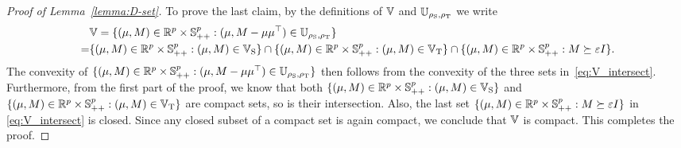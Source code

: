 \documentclass{article}
\begin{document}
\begin{proof}[Proof of Lemma~\ref{lemma:D-set}]
	To prove the last claim, by the definitions of $\mathbb V$ and $\mathbb U_{\rho_{\rm S}, \rho_{\rm T}}$ we write
	\begin{align}
	    &\mathbb V = \{(\mu, M) \in \mathbb{R}^p\times \mathbb S^p_{++} :(\mu, M- \mu\mu^\top) \in \mathbb U_{\rho_{\rm S}, \rho_{\rm T}}\}\notag\\
	    = &\{(\mu, M) \in \mathbb{R}^p\times \mathbb S^p_{++} : (\mu, M) \in \mathbb V_{\rm S}\} \cap \{(\mu, M) \in \mathbb{R}^p\times \mathbb S^p_{++}: (\mu, M) \in \mathbb V_{\rm T} \}\cap \{(\mu, M) \in \mathbb{R}^p\times \mathbb S^p_{++}: M\succeq \varepsilon I\} \label{eq:V_intersect}.
	\end{align}
	The convexity of $\{(\mu, M) \in \mathbb{R}^p\times \mathbb S^p_{++} :(\mu, M- \mu\mu^\top) \in \mathbb U_{\rho_{\rm S}, \rho_{\rm T}}\}$ then follows from the convexity of the three sets in~\eqref{eq:V_intersect}.
	Furthermore, from the first part of the proof, we know that both $\{(\mu, M) \in \mathbb{R}^p\times \mathbb S^p_{++} : (\mu, M) \in \mathbb V_{\rm S}\}$ and $\{(\mu, M) \in \mathbb{R}^p\times \mathbb S^p_{++}: (\mu, M) \in \mathbb V_{\rm T} \}$ are compact sets, so is their intersection. Also, the last set $\{(\mu, M) \in \mathbb{R}^p\times \mathbb S^p_{++}: M\succeq \varepsilon I\}$ in \eqref{eq:V_intersect} is closed. Since any closed subset of a compact set is again compact, we conclude that $\mathbb V$ is compact. This completes the proof.
	

\end{proof}
\end{document}
